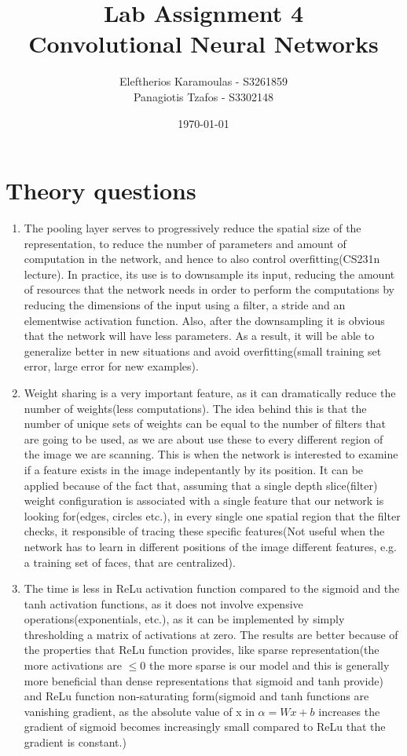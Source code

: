 \documentclass{article}
\title{Lab Assignment 4\\ {\Large Convolutional Neural Networks}}
\date{\today}
\author{
 	Eleftherios Karamoulas - S3261859\\ 
	Panagiotis Tzafos - S3302148\\
}
\begin{document}
\maketitle
\section{Theory questions}
\begin{enumerate}
\item The pooling layer serves to progressively reduce the spatial size of the representation, to reduce the number of parameters and amount of computation in the network, and hence to also control overfitting(CS231n lecture). In practice, its use is to downsample its input, reducing the amount of resources that the network needs in order to perform the computations by reducing the dimensions of the input using a filter, a stride and an elementwise activation function. Also, after the downsampling it is obvious that the network will have less parameters. As a result, it will be able to generalize better in new situations and avoid overfitting(small training set error, large error for new examples). 
\item
Weight sharing is a very important feature, as it can dramatically reduce the number of weights(less computations). The idea behind this is that the number of unique sets of weights can be equal to the number of filters that are going to be used, as we are about use these to every different region of the image we are scanning. This is when the network is interested to examine if a feature exists in the image indepentantly by its position. It can be applied because of the fact that, assuming that a single depth slice(filter) weight configuration is associated with a single feature that our network is looking for(edges, circles etc.), in every single one spatial region that the filter checks, it responsible of tracing these specific features(Not useful when the network has to learn in different positions of the image different features, e.g. a training set of faces, that are centralized). 
\item
The time is less in ReLu activation function compared to the sigmoid and the tanh activation functions, as it does not involve expensive operations(exponentials, etc.), as it can be implemented by simply thresholding a matrix of activations at zero. The results are better because of the properties that ReLu function provides, like sparse representation(the more activations are \(\le 0 \) the more sparse is our model and this is generally more beneficial than dense representations that sigmoid and tanh provide) and ReLu function non-saturating form(sigmoid and tanh functions are vanishing gradient, as the absolute value of x in \(\alpha = Wx + b \) increases the gradient of sigmoid becomes increasingly small compared to ReLu that the gradient is constant.) 

\end{enumerate}
\end{document}
